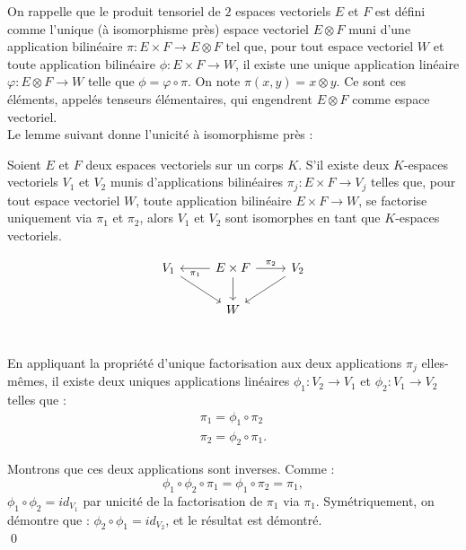 On rappelle que le produit tensoriel de $2$ espaces vectoriels $E$ et $F$ est défini comme l'unique (à isomorphisme près) espace vectoriel $E\otimes F$ muni d'une application bilinéaire $\pi : E\times F \rightarrow E\otimes F$ tel que, pour tout espace vectoriel $W$ et toute application bilinéaire $\phi : E \times F \rightarrow W $, il existe une unique application linéaire $\varphi :E\otimes F \rightarrow W$ telle que $\phi = \varphi\circ \pi$. On note $\pi(x,y)=x\otimes y$. Ce sont ces éléments, appelés tenseurs élémentaires, qui engendrent $E\otimes F$ comme espace vectoriel.\\ 

Le lemme suivant donne l'unicité à isomorphisme près :

\begin{lem}
Soient $E$ et $F$ deux espaces vectoriels sur un corps $K$. S'il existe deux $K$-espaces vectoriels $V_1$ et $V_2$ munis d'applications bilinéaires $\pi_j : E\times F \rightarrow V_j$ telles que, pour tout espace vectoriel $W$, toute application bilinéaire $E\times F \rightarrow W$,  se factorise uniquement via $\pi_1$ et $\pi_2$, alors $V_1$ et $V_2$ sont isomorphes en tant que $K$-espaces vectoriels.
\end{lem}


\[\begin{tikzcd}
V_1 \arrow{dr}& \arrow{l}{\pi_1}	E\times F \arrow{d}\arrow{r}{\pi_2}	& \arrow{dl}V_2 \\
			 & 		W		&	\\
\end{tikzcd}\]

\begin{dem}
En appliquant la propriété d'unique factorisation aux deux applications $\pi_j$ elles-mêmes, il existe deux uniques applications linéaires $\phi_1 : V_2\rightarrow V_1$ et $\phi_2 : V_1\rightarrow V_2$ telles que :
\[\begin{array}{c}\pi_1=\phi_1\circ \pi_2 \\ \pi_2=\phi_2\circ \pi_1.\end{array}\]

Montrons que ces deux applications sont inverses. Comme :
\[\phi_1\circ \phi_2 \circ \pi_1 = \phi_1\circ \pi_2 =\pi_1 ,\]
$\phi_1\circ \phi_2 = id_{V_1}$ par unicité de la factorisation de $\pi_1$ via $\pi_1$.
Symétriquement, on démontre que : $\phi_2\circ \phi_1 = id_{V_2}$, et le résultat est démontré.\\
\qed
\end{dem}

